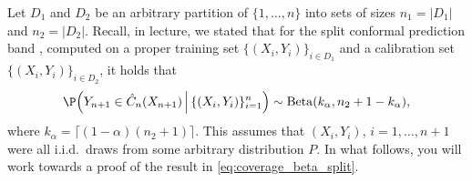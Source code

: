 \documentclass{article}
\begin{document}
\def\hC{\hat{C}}

Let $D_1$ and $D_2$ be an arbitrary partition of $\{1,\dots,n\}$ into sets of
sizes $n_1=|D_1|$ and $n_2=|D_2|$. Recall, in lecture, we stated that for the
split conformal prediction band \smash{$\hC_n$}, computed on a proper training
set $\{(X_i,Y_i)\}_{i \in D_1}$ and a calibration set $\{(X_i,Y_i)\}_{i \in D_2}$, it
holds that  
\begin{equation}
\label{eq:coverage_beta_split}
\P\Big(Y_{n+1} \in \hC_n(X_{n+1}) \, \Big| \, \{ (X_i,Y_i) \}_{i=1}^n \Big)
\sim \mathrm{Beta}(k_\alpha, n_2+1-k_\alpha), 
\end{equation}
where $k_\alpha = \lceil (1-\alpha)(n_2+1) \rceil$. This assumes that
$(X_i,Y_i)$, $i=1,\dots,n+1$ were all i.i.d.\ draws from some arbitrary
distribution $P$. In what follows, you will work towards a proof of the result
in \eqref{eq:coverage_beta_split}.   
\end{document}
